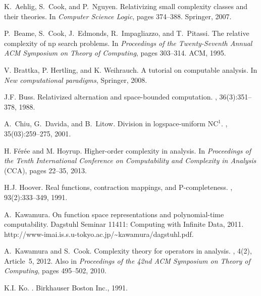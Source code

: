 \documentclass[a4paper,UKenglish]{lipics}
\begin{document}
\begin{thebibliography}{10}

K.~Aehlig, S.~Cook, and P.~Nguyen.
\newblock Relativizing small complexity classes and their theories.
\newblock In {\em Computer Science Logic}, pages 374--388. Springer, 2007.

P.~Beame, S.~Cook, J.~Edmonds, R.~Impagliazzo, and T.~Pitassi.
\newblock The relative complexity of np search problems.
\newblock In {\em Proceedings of the Twenty-Seventh Annual ACM Symposium on
  Theory of Computing}, pages 303--314. ACM, 1995.

V. Brattka, P. Hertling, and K. Weihrauch. 
\newblock A tutorial on computable analysis. 
\newblock In \emph{New computational paradigms}, Springer, 2008. 


J.F. Buss.
\newblock Relativized alternation and space-bounded computation.
, 36(3):351--378, 1988.

A.~Chiu, G.~Davida, and B.~Litow.
\newblock Division in logspace-uniform $\mathrm{NC}^1$.
,
  35(03):259--275, 2001.

H. Férée and M. Hoyrup. 
\newblock Higher-order complexity in analysis. 
\newblock In \emph{Proceedings of the Tenth International Conference on Computability and Complexity in Analysis} (CCA), pages 22--35, 2013.

H.J. Hoover.
\newblock Real functions, contraction mappings, and $\mathrm{P}$-completeness.
, 93(2):333--349, 1991.

A.~Kawamura.
\newblock On function space representations and polynomial-time computability.
\newblock Dagstuhl Seminar 11411: Computing with Infinite Data, 2011.
\newblock http://www-imai.is.s.u-tokyo.ac.jp/{\~{}}kawamura/dagstuhl.pdf.

A.~Kawamura and S.~Cook.
\newblock Complexity theory for operators in analysis.
, 4(2), Article~5, 2012.
\newblock Also in \emph{Proceedings of the 42nd ACM Symposium on Theory of
  Computing}, pages 495--502, 2010.

K.I. Ko.
.
\newblock Birkhauser Boston Inc., 1991.


\end{thebibliography}
\end{document}
